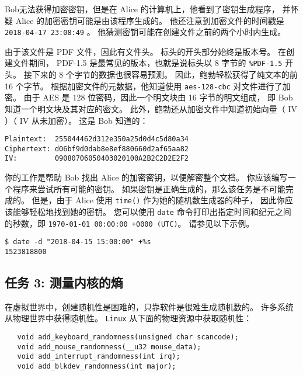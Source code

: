 Bob无法获得加密密钥，但是在 Alice 的计算机上，他看到了密钥生成程序，
并怀疑 Alice 的加密密钥可能是由该程序生成的。
他还注意到加密文件的时间戳是 \texttt{2018-04-17 23:08:49} 。
他猜测密钥可能在创建文件之前的两个小时内生成。


由于该文件是 PDF 文件，因此有文件头。
标头的开头部分始终是版本号。
在创建文件期间， PDF-1.5 是最常见的版本，也就是说标头以 8 字节的 \texttt{\%PDF-1.5} 开头。
接下来的 8 个字节的数据也很容易预测。
因此，鲍勃轻松获得了纯文本的前 16 个字节。
根据加密文件的元数据，他知道使用 \texttt{aes-128-cbc} 对文件进行了加密。
由于 AES 是 128 位密码，因此一个明文块由 16 字节的明文组成，
即 Bob 知道一个明文块及其对应的密文。
此外，鲍勃还从加密文件中知道初始向量（ IV ）（ IV 从未加密）。
这是 Bob 知道的：


\begin{lstlisting}
Plaintext:  255044462d312e350a25d0d4c5d80a34
Ciphertext: d06bf9d0dab8e8ef880660d2af65aa82
IV:         09080706050403020100A2B2C2D2E2F2
\end{lstlisting}


你的工作是帮助 Bob 找出 Alice 的加密密钥，以便解密整个文档。
你应该编写一个程序来尝试所有可能的密钥。
如果密钥是正确生成的，那么该任务是不可能完成的。
但是，由于 Alice 使用 \texttt{time()} 作为她的随机数生成器的种子，
因此你应该能够轻松地找到她的密钥。
您可以使用 \texttt{date} 命令打印出指定时间和纪元之间的秒数，即
\texttt{1970-01-01 00:00:00 +0000 (UTC)}。
请参见以下示例。

\begin{lstlisting}
$ date -d "2018-04-15 15:00:00" +%s
1523818800
\end{lstlisting}




\subsection{任务 3: 测量内核的熵}

在虚拟世界中，创建随机性是困难的，只靠软件是很难生成随机数的。
许多系统从物理世界中获得随机性。
\texttt{Linux} 从下面的物理资源中获取随机性：


\begin{lstlisting}
   void add_keyboard_randomness(unsigned char scancode);
   void add_mouse_randomness(__u32 mouse_data);
   void add_interrupt_randomness(int irq);
   void add_blkdev_randomness(int major);
\end{lstlisting}

